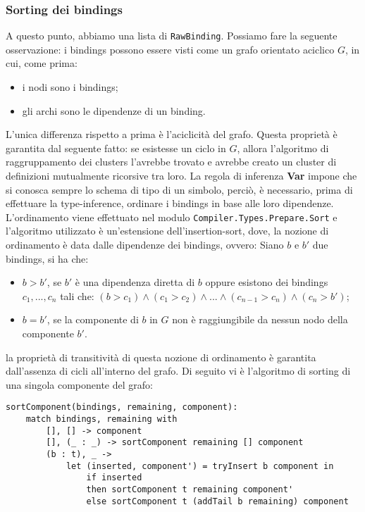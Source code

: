 \documentclass[10pt,a4paper]{article}
\begin{document}
\hypertarget{Sorting dei bindings}{\subsubsection{Sorting dei bindings}}
A questo punto, abbiamo una lista di \texttt{RawBinding}. Possiamo fare la seguente osservazione: i bindings possono
essere visti come un grafo orientato aciclico $ G $, in cui, come prima:
\begin{itemize}
    \item i nodi sono i bindings;
    \item gli archi sono le dipendenze di un binding.
\end{itemize}
L'unica differenza rispetto a prima è l'aciclicità del grafo. Questa proprietà è garantita dal seguente fatto: se
esistesse un ciclo
in $ G $, allora l'algoritmo di raggruppamento dei clusters l'avrebbe trovato e avrebbe creato un cluster di definizioni
mutualmente ricorsive tra loro. La regola di inferenza \textbf{Var} impone che si conosca sempre lo schema di tipo di
un simbolo, perciò, è necessario, prima di effettuare la type-inference, ordinare i bindings in base alle loro dipendenze.
L'ordinamento viene effettuato nel modulo \texttt{Compiler.Types.Prepare.Sort} e l'algoritmo utilizzato è un'estensione
dell'insertion-sort, dove, la nozione di ordinamento è data dalle dipendenze dei bindings, ovvero: \newline
Siano $ b $ e $ b' $ due bindings, si ha che:
\begin{itemize}
    \item $ b > b' $, se $ b' $ è una dipendenza diretta di $ b $ oppure esistono dei bindings $ c_1, ..., c_n $ tali che:
    \newline $ (b > c_1) \wedge (c_1 > c_2) \wedge ... \wedge (c_{n-1} > c_n) \wedge (c_n > b') $;
    \item $ b = b' $, se la componente di $ b $ in $ G $ non è raggiungibile da nessun nodo della componente $ b' $.
\end{itemize}
la proprietà di transitività di questa nozione di ordinamento è garantita dall'assenza di cicli all'interno del grafo.
Di seguito vi è l'algoritmo di sorting di una singola componente del grafo:
\begin{lstlisting}
sortComponent(bindings, remaining, component):
    match bindings, remaining with
        [], [] -> component
        [], (_ : _) -> sortComponent remaining [] component
        (b : t), _ ->
            let (inserted, component') = tryInsert b component in
                if inserted
                then sortComponent t remaining component'
                else sortComponent t (addTail b remaining) component 
\end{lstlisting}
\end{document}
